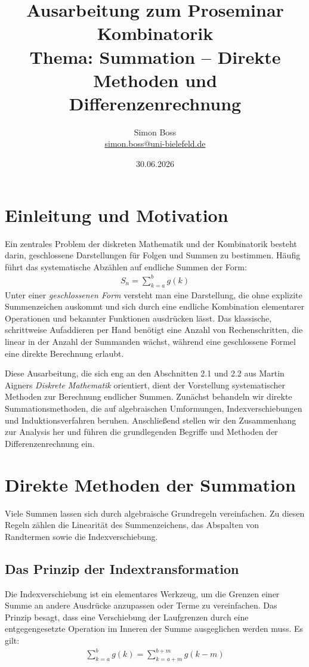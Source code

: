 \documentclass{article}
\title{Ausarbeitung zum Proseminar Kombinatorik\\ \large Thema: Summation -- Direkte Methoden und Differenzenrechnung}
\date{30.06.2026}
\author{Simon Boss\\ \url{simon.boss@uni-bielefeld.de}}
\theoremstyle{definition}
\begin{document}
\maketitle
\tableofcontents 
\newpage         

\section{Einleitung und Motivation}
Ein zentrales Problem der diskreten Mathematik und der Kombinatorik besteht darin, geschlossene Darstellungen für Folgen und Summen zu bestimmen. Häufig führt das systematische Abzählen auf endliche Summen der Form:
\begin{align*}
    S_n = \sum_{k=a}^b g(k)
\end{align*}
Unter einer \textit{geschlossenen Form} versteht man eine Darstellung, die ohne explizite Summenzeichen auskommt und sich durch eine endliche Kombination elementarer Operationen und bekannter Funktionen ausdrücken lässt. Das klassische, schrittweise Aufaddieren per Hand benötigt eine Anzahl von Rechenschritten, die linear in der Anzahl der Summanden wächst, während eine geschlossene Formel eine direkte Berechnung erlaubt.

Diese Ausarbeitung, die sich eng an den Abschnitten 2.1 und 2.2 aus Martin Aigners \textit{Diskrete Mathematik} \cite{aigner} orientiert,  dient der Vorstellung systematischer Methoden zur Berechnung endlicher Summen. Zunächst behandeln wir direkte Summationsmethoden, die auf algebraischen Umformungen, Indexverschiebungen und Induktionsverfahren beruhen. Anschließend stellen wir den Zusammenhang zur Analysis her und führen die grundlegenden Begriffe und Methoden der Differenzenrechnung ein.

\section{Direkte Methoden der Summation}
Viele Summen lassen sich durch algebraische Grundregeln vereinfachen. Zu diesen Regeln zählen die Linearität des Summenzeichens, das Abspalten von Randtermen sowie die Indexverschiebung.

\subsection{Das Prinzip der Indextransformation}
Die Indexverschiebung ist ein elementares Werkzeug, um die Grenzen einer Summe an andere Ausdrücke anzupassen oder Terme zu vereinfachen. Das Prinzip besagt, dass eine Verschiebung der Laufgrenzen durch eine entgegengesetzte Operation im Inneren der Summe ausgeglichen werden muss. Es gilt:
\begin{align*}
    \sum_{k=a}^b g(k) = \sum_{k=a+m}^{b+m} g(k-m)
\end{align*}
\end{document}
